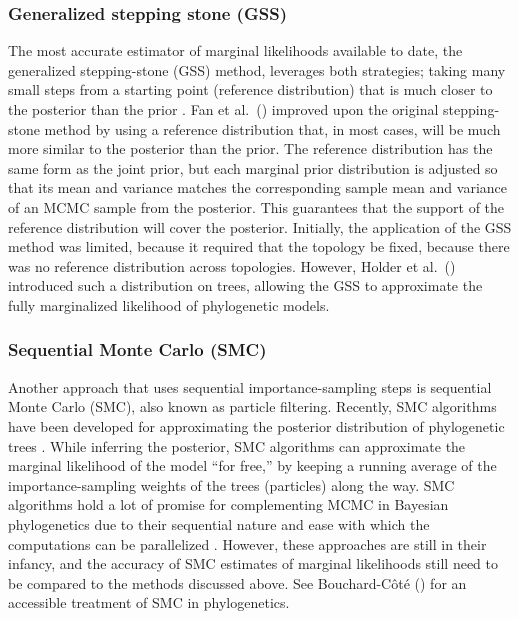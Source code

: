 \subsubsection{Generalized stepping stone (GSS)}
The most accurate estimator of marginal likelihoods available to date, the
generalized stepping-stone (GSS) method, leverages both strategies; taking many
small steps from a starting point (reference distribution) that is much closer
to the posterior than the prior \citep{Fan2011}.
Fan et al.\ (\citeyear{Fan2011}) improved upon the original stepping-stone
method by using a reference distribution that, in most cases, will be much more
similar to the posterior than the prior.
The reference distribution has the same form as the joint prior, but each
marginal prior distribution is adjusted so that its mean and variance matches
the corresponding sample mean and variance of an MCMC sample from the
posterior.
This guarantees that the support of the reference distribution will cover the
posterior.
Initially, the application of the GSS method was limited, because it required
that the topology be fixed, because there was no reference distribution across
topologies.
However, Holder et al.\ (\citeyear{Holder2014}) introduced such a distribution
on trees, allowing the GSS to approximate the fully marginalized likelihood of
phylogenetic models.

\subsubsection{Sequential Monte Carlo (SMC)}
Another approach that uses sequential importance-sampling steps is sequential
Monte Carlo (SMC), also known as particle filtering.
Recently, SMC algorithms have been developed for approximating the posterior
distribution of phylogenetic trees \citep{Jordan2012,Bouchard2014}.
While inferring the posterior, SMC algorithms can approximate the marginal
likelihood of the model ``for free,'' by keeping a running average of the
importance-sampling weights of the trees (particles) along the way.
SMC algorithms hold a lot of promise for complementing MCMC in Bayesian
phylogenetics due to their sequential nature and ease with which the
computations can be parallelized
\citep{Jordan2012,Dinh2016preprint,Fourment2017preprint}.
However, these approaches are still in their infancy, and the accuracy of SMC
estimates of marginal likelihoods still need to be compared to the methods
discussed above.
See Bouchard-C\^{o}t\'{e} (\citeyear{Bouchard2014}) for an accessible treatment
of SMC in phylogenetics.

